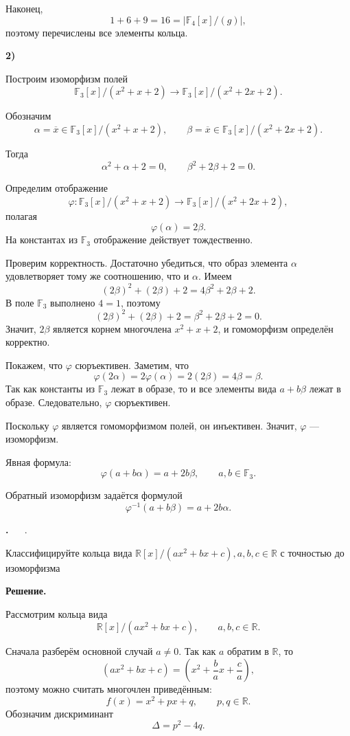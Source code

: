 \documentclass[12pt,a4paper]{article}
\newcounter{task}                   %
\newenvironment{task}[1][]{%
  \refstepcounter{task}%
  \par\vspace{0.3\baselineskip}%
  \noindent\textbf{\thetask.}%
  \if\relax\detokenize{#1}\relax   %
    \ \ignorespaces                 %
  \else
    \ \textbf{#1}.\ \ignorespaces   %
  \fi
}{%
  \par\vspace{0.2\baselineskip}%
}
\newcommand{\sol}{%
  \par\vspace{0.3\baselineskip}%
  \noindent\textbf{Решение.}\ %
  \ignorespaces                     %
}
\newcommand{\soli}[1]{%
  \par\vspace{0.15\baselineskip}%
  \noindent\textbf{#1)}\ %
  \ignorespaces                     %
}
\begin{document}
Наконец,
\[
1+6+9=16=|\mathbb{F}_4[x]/(g)|,
\]
поэтому перечислены все элементы кольца.

\soli{2}

Построим изоморфизм полей
\[
\mathbb{F}_3[x]/(x^2+x+2) \to \mathbb{F}_3[x]/(x^2+2x+2).
\]

Обозначим
\[
\alpha=\overline{x}\in \mathbb{F}_3[x]/(x^2+x+2),
\qquad
\beta=\overline{x}\in \mathbb{F}_3[x]/(x^2+2x+2).
\]

Тогда
\[
\alpha^2+\alpha+2=0,
\qquad
\beta^2+2\beta+2=0.
\]

Определим отображение
\[
\varphi\colon \mathbb{F}_3[x]/(x^2+x+2)\to \mathbb{F}_3[x]/(x^2+2x+2),
\]
полагая
\[
\varphi(\alpha)=2\beta.
\]
На константах из $\mathbb{F}_3$ отображение действует тождественно.

Проверим корректность. Достаточно убедиться, что образ элемента $\alpha$ удовлетворяет тому же соотношению, что и $\alpha$. Имеем
\[
(2\beta)^2+(2\beta)+2
=
4\beta^2+2\beta+2.
\]
В поле $\mathbb{F}_3$ выполнено $4=1$, поэтому
\[
(2\beta)^2+(2\beta)+2
=
\beta^2+2\beta+2=0.
\]
Значит, $2\beta$ является корнем многочлена $x^2+x+2$, и гомоморфизм определён корректно.

Покажем, что $\varphi$ сюръективен. Заметим, что
\[
\varphi(2\alpha)=2\varphi(\alpha)=2(2\beta)=4\beta=\beta.
\]
Так как константы из $\mathbb{F}_3$ лежат в образе, то и все элементы вида $a+b\beta$ лежат в образе. Следовательно, $\varphi$ сюръективен.

Поскольку $\varphi$ является гомоморфизмом полей, он инъективен. Значит, $\varphi$ — изоморфизм.

Явная формула:
\[
\boxed{
\varphi(a+b\alpha)=a+2b\beta,
\qquad
a,b\in\mathbb{F}_3.
}
\]

Обратный изоморфизм задаётся формулой
\[
\varphi^{-1}(a+b\beta)=a+2b\alpha.
\]



\begin{task}
	Классифицируйте кольца вида $\mathbb{R}[x] / (ax^2 + bx + c), a, b, c \in \mathbb{R}$ с точностью до изоморфизма
\end{task}

\sol

Рассмотрим кольца вида
\[
\mathbb R[x]/(ax^2+bx+c),
\qquad a,b,c\in\mathbb R.
\]

Сначала разберём основной случай $a\neq 0$. Так как $a$ обратим в $\mathbb R$, то
\[
(ax^2+bx+c)=\left(x^2+\frac ba x+\frac ca\right),
\]
поэтому можно считать многочлен приведённым:
\[
f(x)=x^2+px+q,
\qquad p,q\in\mathbb R.
\]
Обозначим дискриминант
\[
\Delta=p^2-4q.
\]
\end{document}
